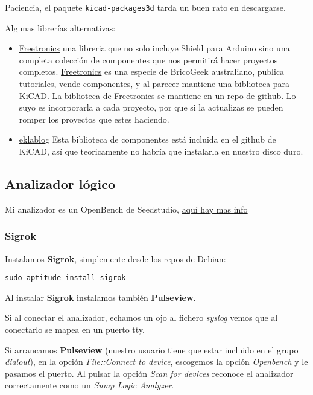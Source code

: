 \documentclass[
  12pt,
  spanish,
]{article}
\providecommand{\tightlist}{%
  \setlength{\itemsep}{0pt}\setlength{\parskip}{0pt}}
\begin{document}
Paciencia, el paquete \texttt{kicad-packages3d} tarda un buen rato en
descargarse.

Algunas librerías alternativas:

\begin{itemize}
\tightlist
\item
  \href{https://github.com/freetronics/freetronics_kicad_library}{Freetronics}
  una libreria que no solo incluye Shield para Arduino sino una completa
  colección de componentes que nos permitirá hacer proyectos completos.
  \href{http://www.freetronics.com}{Freetronics} es una especie de
  BricoGeek australiano, publica tutoriales, vende componentes, y al
  parecer mantiene una biblioteca para KiCAD. La biblioteca de
  Freetronics se mantiene en un repo de github. Lo suyo es incorporarla
  a cada proyecto, por que si la actualizas se pueden romper los
  proyectos que estes haciendo.
\item
  \href{http://meta-blog.eklablog.com/kicad-librairie-arduino-pretty-p930786}{eklablog}
  Esta biblioteca de componentes está incluida en el github de KiCAD,
  así que teoricamente no habría que instalarla en nuestro disco duro.
\end{itemize}

\hypertarget{analizador-luxf3gico}{%
\subsection{Analizador lógico}\label{analizador-luxf3gico}}

Mi analizador es un OpenBench de Seedstudio,
\href{http://dangerousprototypes.com/docs/Open_Bench_Logic_Sniffer}{aquí
hay mas info}

\hypertarget{sigrok}{%
\subsubsection{Sigrok}\label{sigrok}}

Instalamos \textbf{Sigrok}, simplemente desde los repos de Debian:

\begin{verbatim}
sudo aptitude install sigrok
\end{verbatim}

Al instalar \textbf{Sigrok} instalamos también \textbf{Pulseview}.

Si al conectar el analizador, echamos un ojo al fichero \emph{syslog}
vemos que al conectarlo se mapea en un puerto tty.

Si arrancamos \textbf{Pulseview} (nuestro usuario tiene que estar
incluido en el grupo \emph{dialout}), en la opción \emph{File::Connect
to device}, escogemos la opción \emph{Openbench} y le pasamos el puerto.
Al pulsar la opción \emph{Scan for devices} reconoce el analizador
correctamente como un \emph{Sump Logic Analyzer}.
\end{document}
